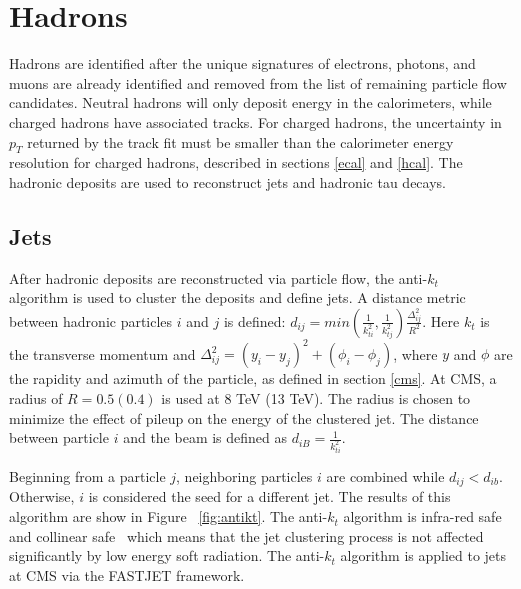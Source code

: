 \documentclass[oneside, letterpaper, oldfontcommands]{memoir}
\begin{document}
\section{Hadrons}\label{hadrons}
Hadrons are identified after the unique signatures of electrons, photons, and muons are already identified and removed from the list of remaining particle flow candidates. Neutral hadrons will only deposit energy in the calorimeters, while charged hadrons have associated tracks. For charged hadrons, the uncertainty in $p_{T}$ returned by the track fit must be smaller than the calorimeter energy resolution for charged hadrons, described in sections \ref{ecal} and \ref{hcal}. The hadronic deposits are used to reconstruct jets and hadronic tau decays.

\subsection{Jets}\label{jets}
\qquad After hadronic deposits are reconstructed via particle flow, the anti-$k_{t}$ ~\cite{Cacciari:2008gp} algorithm is used to cluster the deposits and define jets. A distance metric between hadronic particles $i$ and $j$ is defined: $d_{ij} = min(\frac{1}{k_{ti}^{2}},\frac{1}{k_{tj}^{2}})\frac{\Delta_{ij}^{2}}{R^{2}}$. Here $k_{t}$ is the transverse momentum and $\Delta_{ij}^{2} = (y_{i}-y_{j})^{2} + (\phi_{i} - \phi_{j})$, where $y$ and $\phi$ are the rapidity and azimuth of the particle, as defined in section \ref{cms}. At CMS, a radius of $R = 0.5 (0.4)$ is used at 8 TeV (13 TeV). The radius is chosen to minimize the effect of pileup on the energy of the clustered jet. The distance between particle $i$ and the beam is defined as $d_{iB} = \frac{1}{k_{ti}^{2}}$.

\qquad Beginning from a particle $j$, neighboring particles $i$ are combined while $d_{ij} < d_{ib}$. Otherwise, $i$ is considered the seed for a different jet. The results of this algorithm are show in Figure ~\ref{fig:antikt}. The anti-$k_{t}$ algorithm is infra-red safe and collinear safe~\cite{Cacciari:2008gp} which means that the jet clustering process is not affected significantly by low energy soft radiation. The anti-$k_{t}$ algorithm is applied to jets at CMS via the FASTJET framework\cite{Cacciari:2011ma}.
\end{document}
